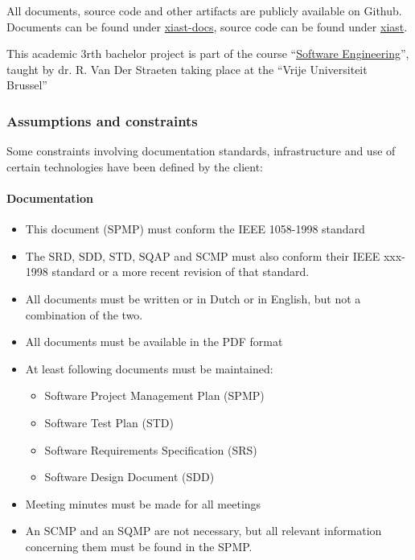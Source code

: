 \documentclass[9pt]{article}
\begin{document}
All documents, source code and other artifacts are publicly available on
Github. Documents can be found under
\href{https://github.com/se1-1314/xiast-docs}{xiast-docs}, source code
can be found under \href{https://github.com/se1-1314/xiast}{xiast}.

This academic 3rth bachelor project is part of the course
``\hyperref[SoftEng]{Software Engineering}'', taught by dr. R. Van Der
Straeten taking place at the ``Vrije Universiteit Brussel''

\subsubsection{Assumptions and
constraints}\label{assumptions-and-constraints}

Some constraints involving documentation standards, infrastructure and
use of certain technologies have been defined by the client:

\paragraph{Documentation}\label{documentation}

\begin{itemize}
\itemsep1pt\parskip0pt
\item
  This document (SPMP) must conform the IEEE 1058-1998 standard
\item
  The SRD, SDD, STD, SQAP and SCMP must also conform their IEEE xxx-1998
  standard or a more recent revision of that standard.
\item
  All documents must be written or in Dutch or in English, but not a
  combination of the two.
\item
  All documents must be available in the PDF format
\item
  At least following documents must be maintained:

  \begin{itemize}
  \itemsep1pt\parskip0pt
  \item
    Software Project Management Plan (SPMP)
  \item
    Software Test Plan (STD)
  \item
    Software Requirements Specification (SRS)
  \item
    Software Design Document (SDD)
  \end{itemize}
\item
  Meeting minutes must be made for all meetings
\item
  An SCMP and an SQMP are not necessary, but all relevant information
  concerning them must be found in the SPMP.
\end{itemize}
\end{document}
